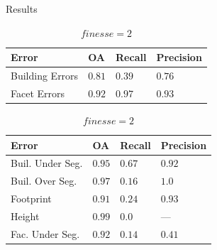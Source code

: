 \documentclass{beamer}
\begin{document}
            \begin{frame}[plain]{Results}
                \begin{table}
                    \begin{subtable}{.4\textwidth}
                        \tiny
                        \begin{center}
                            \begin{tabular}{x{1cm} x{.5cm} x{.5cm} x{.5cm}}
                                \toprule
                                {\bf Error} & {\bf OA} & {\bf Recall} & {\bf Precision} \\
                                \midrule
                                Building Errors & $0.81$ & $0.39$ & $0.76$ \\
                                \midrule
                                Facet Errors & $0.92$ & $0.97$ & $0.93$ \\
                                \bottomrule
                            \end{tabular}
                            \caption{\tiny\label{tab::finesse2} $finesse = 2$}
                        \end{center}
                    \end{subtable}
                    \begin{subtable}{.45\textwidth}
                        \tiny
                        \begin{center}
                            \begin{tabular}{x{1.75cm} x{.5cm} x{.5cm} x{.5cm}}
                                \toprule
                                {\bf Error} & {\bf OA} & {\bf Recall} & {\bf Precision} \\
                                \midrule
                                Buil. Under Seg. & $0.95$ & $0.67$ & $0.92$ \\
                                \midrule
                                Buil. Over Seg. & $0.97$ & $0.16$ & $1.0$ \\
                                \midrule
                                Footprint & $0.91$ & $0.24$ & $0.93$ \\
                                \midrule
                                Height & $0.99$ & $0.0$ & --- \\
                                \midrule
                                \midrule
                                Fac. Under Seg. & $0.92$ & $0.14$ & $0.41$ \\

\end{tabular}
\end{center}
\end{subtable}
\end{table}
\end{frame}
\end{document}
